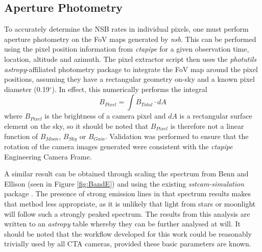 \subsection{Aperture Photometry}
\label{sec:pixelextract}
To accurately determine the NSB rates in individual pixels, one must perform aperture photometry on the FoV maps generated by \textit{nsb}. This can be performed using the pixel position information from \textit{ctapipe} \cite{ctapipe2} for a given observation time, location, altitude and azimuth. The pixel extractor script then uses the \textit{photutils} \textit{astropy}-affiliated \cite{astropy:2018} photometry package \cite{photutils} to integrate the FoV map around the pixel positions, assuming they have a rectangular geometry on-sky and a known pixel diameter (0.19$^{\circ}$). In effect, this numerically performs the integral
\begin{equation}
    B_{Pixel}=\int B_{Total} \cdot dA
\end{equation}
where $B_{Pixel}$ is the brightness of a camera pixel and $dA$ is a rectangular surface element on the sky, so it should be noted that $B_{Pixel}$ is therefore not a linear function of $B_{Moon}$, $B_{Sky}$ or $B_{Gaia}$. Validation was performed to ensure that the rotation of the camera images generated were consistent with the \textit{ctapipe} Engineering Camera Frame.

A similar result can be obtained through scaling the spectrum from Benn and Ellison \cite{BandE} (seen in Figure \ref{fig:BandE}) and using the existing \textit{sstcam-simulation} package \cite{sstcamsimulation}. The presence of strong emission lines in that spectrum results makes that method less appropriate, as it is unlikely that light from stars or moonlight will follow such a strongly peaked spectrum. The results from this analysis are written to an \textit{astropy} table whereby they can be further analysed at will. It should be noted that the workflow developed for this work could be reasonably trivially used by all CTA cameras, provided these basic parameters are known.

